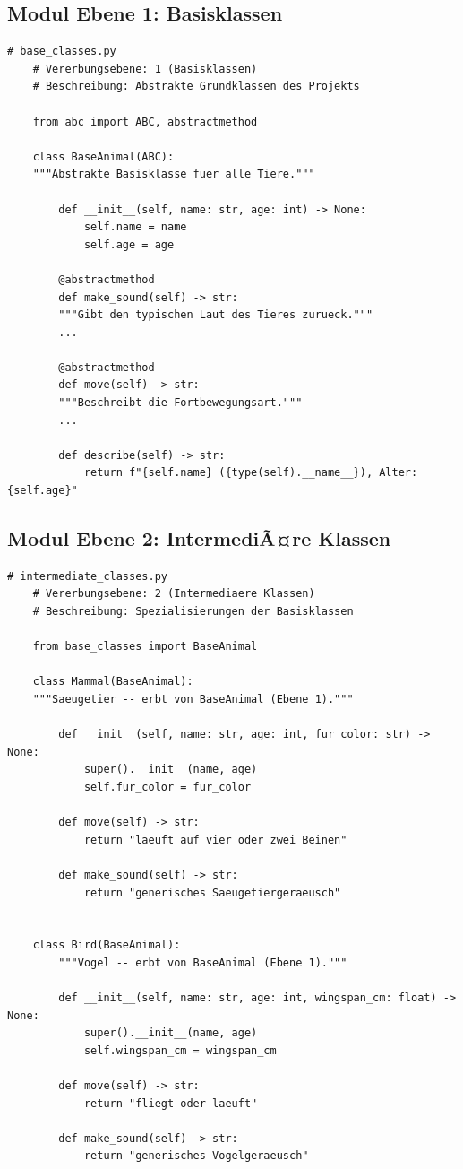 ﻿\documentclass[a4paper,12pt]{article}
\begin{document}
\subsection{Modul Ebene 1: Basisklassen}

\begin{lstlisting}[caption={base\_classes.py -- Ebene 1 der Vererbungshierarchie},
	label={lst:base}]
	# base_classes.py
	# Vererbungsebene: 1 (Basisklassen)
	# Beschreibung: Abstrakte Grundklassen des Projekts
	
	from abc import ABC, abstractmethod
	
	class BaseAnimal(ABC):
	"""Abstrakte Basisklasse fuer alle Tiere."""
	
		def __init__(self, name: str, age: int) -> None:
			self.name = name
			self.age = age
	
		@abstractmethod
		def make_sound(self) -> str:
		"""Gibt den typischen Laut des Tieres zurueck."""
		...
	
		@abstractmethod
		def move(self) -> str:
		"""Beschreibt die Fortbewegungsart."""
		...
	
		def describe(self) -> str:
			return f"{self.name} ({type(self).__name__}), Alter: {self.age}"
\end{lstlisting}

\subsection{Modul Ebene 2: IntermediÃ¤re Klassen}

\begin{lstlisting}[caption={intermediate\_classes.py -- Ebene 2 der Vererbungshierarchie},
	label={lst:intermediate}]
	# intermediate_classes.py
	# Vererbungsebene: 2 (Intermediaere Klassen)
	# Beschreibung: Spezialisierungen der Basisklassen
	
	from base_classes import BaseAnimal
	
	class Mammal(BaseAnimal):
	"""Saeugetier -- erbt von BaseAnimal (Ebene 1)."""
	
		def __init__(self, name: str, age: int, fur_color: str) -> None:
			super().__init__(name, age)
			self.fur_color = fur_color
		
		def move(self) -> str:
			return "laeuft auf vier oder zwei Beinen"
		
		def make_sound(self) -> str:
			return "generisches Saeugetiergeraeusch"
		
		
	class Bird(BaseAnimal):
		"""Vogel -- erbt von BaseAnimal (Ebene 1)."""
		
		def __init__(self, name: str, age: int, wingspan_cm: float) -> None:
			super().__init__(name, age)
			self.wingspan_cm = wingspan_cm
		
		def move(self) -> str:
			return "fliegt oder laeuft"
		
		def make_sound(self) -> str:
			return "generisches Vogelgeraeusch"
\end{lstlisting}
\end{document}
